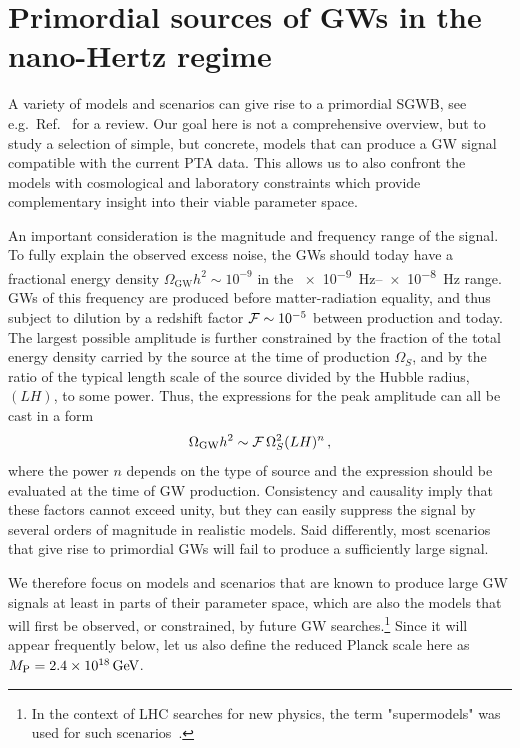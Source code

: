 \documentclass{article}
\newcommand*{\GW}{\ensuremath{\mathrm{GW}}\xspace}
\begin{document}
\section{Primordial sources of GWs in the nano-Hertz regime}
\label{sec:sources}

A variety of models and scenarios can give rise to a primordial SGWB, see e.g.\ Ref.~\cite{Caprini:2018mtu} for a review. Our goal here is not a comprehensive overview, but to study a selection of simple, but concrete, models that can produce a GW signal compatible with the current PTA data. This allows us to also confront the models with cosmological and laboratory constraints which provide complementary insight into their viable parameter space. 

An important consideration is the magnitude and frequency range of the signal. To fully explain the observed excess noise, the GWs should today have a fractional energy density $\Omega_\GW h^2 \sim 10^{-9}$ in the \SIrange{e-9}{e-8}{\Hz} range. GWs of this frequency are produced before matter-radiation equality, and thus subject to dilution by a redshift factor ${\cal F} \sim 10^{-5}$ between production and today. The largest possible amplitude is further constrained by the fraction of the total energy density carried by the source at the time of production $\Omega_S$, and by the ratio of the typical length scale of the source divided by the Hubble radius, $(LH)$, to some power. Thus, the expressions for the peak amplitude can all be cast in a form 
\begin{equation}
    \Omega_{\GW}h^2 \sim {\cal F}\, \Omega_S^2 (L H)^n\,,
\end{equation}
%
where the power $n$ depends on the type of source and the expression should be evaluated at the time of GW production. 
Consistency and causality imply that these factors cannot exceed unity, but they can easily suppress the signal by several orders of magnitude in realistic models. Said differently, most scenarios that give rise to primordial GWs will fail to produce a sufficiently large signal. 

We therefore focus on models and scenarios that are known to produce large GW signals at least in parts of their parameter space, which are also the models that will first be observed, or constrained, by future GW searches.\footnote{In the context of LHC searches for new physics, the term "supermodels" was used for such scenarios~\cite{Bauer:2009cc}.} Since it will appear frequently below, let us also define the reduced Planck scale here as~$M_{\rm P} = \SI{2.4e18}{\GeV}$. 
\end{document}

